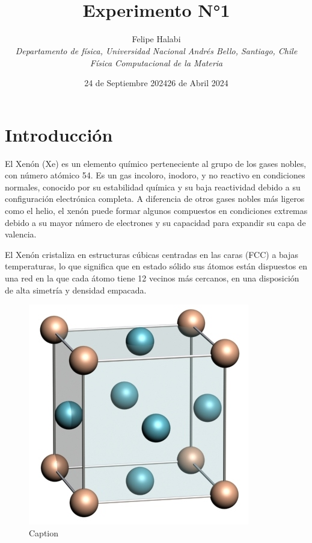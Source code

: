 \documentclass[10pt,letterpaper,twocolumn]{article}
\title{\noindent\\[-4cm]\bfseries Experimento N°1}
\author{Felipe Halabi
\\\small\itshape \textit{Departamento de física, Universidad Nacional Andrés Bello, Santiago, Chile}
\\\small\itshape Física Computacional de la Materia}
\date{24 de Septiembre 2024}
\date{26 de Abril 2024}
\begin{document}
\renewcommand{\tablename}{Tabla}
\section*{Introducción}
El Xenón (Xe) es un elemento químico perteneciente al grupo de los gases nobles, con número atómico 54. Es un gas incoloro, inodoro, y no reactivo en condiciones normales, conocido por su estabilidad química y su baja reactividad debido a su configuración electrónica completa. A diferencia de otros gases nobles más ligeros como el helio, el xenón puede formar algunos compuestos en condiciones extremas debido a su mayor número de electrones y su capacidad para expandir su capa de valencia.

El Xenón cristaliza en estructuras cúbicas centradas en las caras (FCC) a bajas temperaturas, lo que significa que en estado sólido sus átomos están dispuestos en una red en la que cada átomo tiene 12 vecinos más cercanos, en una disposición de alta simetría y densidad empacada.

\begin{figure}[h]
    \centering
    \includegraphics[width=0.3\linewidth]{FCCStructure.jpg}
    \caption{Caption}
    \label{fig:enter-label}
\end{figure}
\end{document}
